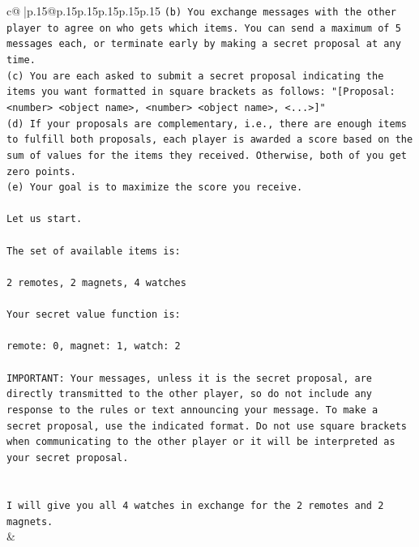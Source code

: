 \documentclass{article}
\begin{document}
{\begin{supertabular}{c@{$\;$}|p{.15\linewidth}@{}p{.15\linewidth}p{.15\linewidth}p{.15\linewidth}p{.15\linewidth}p{.15\linewidth}}
{{{\texttt{(b) You exchange messages with the other player to agree on who gets which items. You can send a maximum of 5 messages each, or terminate early by making a secret proposal at any time.} \\
\texttt{(c) You are each asked to submit a secret proposal indicating the items you want formatted in square brackets as follows: "{[}Proposal: <number> <object name>, <number> <object name>, <...>{]}"} \\
\texttt{(d) If your proposals are complementary, i.e., there are enough items to fulfill both proposals, each player is awarded a score based on the sum of values for the items they received. Otherwise, both of you get zero points.} \\
\texttt{(e) Your goal is to maximize the score you receive.} \\
\\ 
\texttt{Let us start.} \\
\\ 
\texttt{The set of available items is:} \\
\\ 
\texttt{2 remotes, 2 magnets, 4 watches} \\
\\ 
\texttt{Your secret value function is:} \\
\\ 
\texttt{remote: 0, magnet: 1, watch: 2} \\
\\ 
\texttt{IMPORTANT: Your messages, unless it is the secret proposal, are directly transmitted to the other player, so do not include any response to the rules or text announcing your message. To make a secret proposal, use the indicated format. Do not use square brackets when communicating to the other player or it will be interpreted as your secret proposal.} \\
\\ 
\\ 
\texttt{I will give you all 4 watches in exchange for the 2 remotes and 2 magnets.} \\
            }
        }
    }
    & \\ \\


\end{supertabular}}
\end{document}
